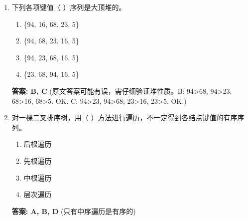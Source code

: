 \documentclass[12pt, a4paper]{article}
\begin{document}
\begin{enumerate}
    \item 下列各项键值（ ）序列是大顶堆的。
    \begin{enumerate}
        \item[A.] \{94, 16, 68, 23, 5\}
        \item[B.] \{94, 68, 23, 16, 5\}
        \item[C.] \{94, 23, 68, 16, 5\}
        \item[D.] \{23, 68, 94, 16, 5\}
    \end{enumerate}
    \textbf{答案: B, C} (原文答案可能有误，需仔细验证堆性质。B: 94>68, 94>23; 68>16, 68>5. OK. C: 94>23, 94>68; 23>16, 23>5. OK.)

    \item 对一棵二叉排序树，用（ ）方法进行遍历，不一定得到各结点键值的有序序列。
    \begin{enumerate}
        \item[A.] 后根遍历
        \item[B.] 先根遍历
        \item[C.] 中根遍历
        \item[D.] 层次遍历
    \end{enumerate}
    \textbf{答案: A, B, D} (只有中序遍历是有序的)
\end{enumerate}
\end{document}
